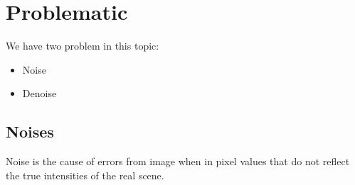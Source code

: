 \vspace*{1cm}



\section{Problematic}
We have two problem in this topic:
\begin{itemize}
\item Noise
\item Denoise
\end{itemize} 

\subsection{Noises}
Noise is the cause of errors from image when in pixel values
that do not reflect the true intensities of the real scene.

\

